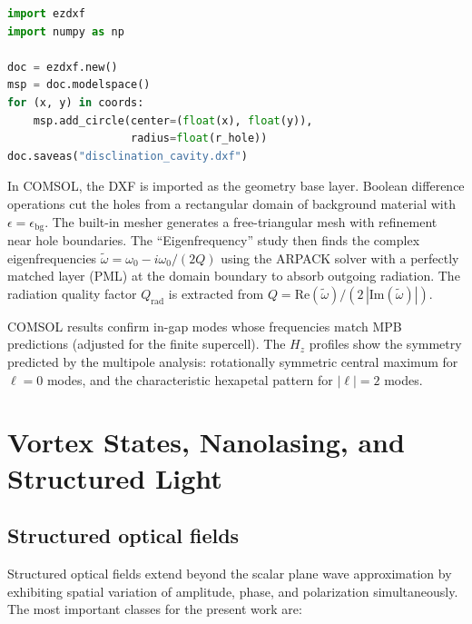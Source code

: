 \documentclass[12pt,a4paper,oneside]{book}
\theoremstyle{plain}
\theoremstyle{definition}
\theoremstyle{remark}
\newcommand{\eps}{\epsilon}
\newcommand{\om}{\omega}
\begin{document}
\begin{lstlisting}[language=Python, caption={Core DXF export logic (schematic from \texttt{dxf\_uniform.py}).}]
import ezdxf
import numpy as np

doc = ezdxf.new()
msp = doc.modelspace()
for (x, y) in coords:
    msp.add_circle(center=(float(x), float(y)),
                   radius=float(r_hole))
doc.saveas("disclination_cavity.dxf")
\end{lstlisting}

In COMSOL, the DXF is imported as the geometry base layer. Boolean difference operations cut the holes from a rectangular domain of background material with $\eps = \eps_\mathrm{bg}$. The built-in mesher generates a free-triangular mesh with refinement near hole boundaries. The ``Eigenfrequency'' study then finds the complex eigenfrequencies $\tilde{\om} = \om_0 - i\om_0/(2Q)$ using the ARPACK solver with a perfectly matched layer (PML) at the domain boundary to absorb outgoing radiation. The radiation quality factor $Q_\mathrm{rad}$ is extracted from $Q = \mathrm{Re}(\tilde{\om})/(2\,|\mathrm{Im}(\tilde{\om})|)$.

COMSOL results confirm in-gap modes whose frequencies match MPB predictions (adjusted for the finite supercell). The $H_z$ profiles show the symmetry predicted by the multipole analysis: rotationally symmetric central maximum for $\ell=0$ modes, and the characteristic hexapetal pattern for $|\ell|=2$ modes.

\chapter{Vortex States, Nanolasing, and Structured Light}
\label{chap:vortex-nanolasing}

\section{Structured optical fields}
\label{sec:structured-light}

Structured optical fields extend beyond the scalar plane wave approximation by exhibiting spatial variation of amplitude, phase, and polarization simultaneously. The most important classes for the present work are:
\end{document}
